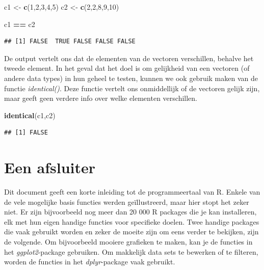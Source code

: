 \documentclass[
]{book}
\newenvironment{Shaded}{\begin{snugshade}}{\end{snugshade}}
\newcommand{\DecValTok}[1]{\textcolor[rgb]{0.00,0.00,0.81}{#1}}
\newcommand{\FunctionTok}[1]{\textcolor[rgb]{0.13,0.29,0.53}{\textbf{#1}}}
\newcommand{\NormalTok}[1]{#1}
\newcommand{\OtherTok}[1]{\textcolor[rgb]{0.56,0.35,0.01}{#1}}
\newcommand{\SpecialCharTok}[1]{\textcolor[rgb]{0.81,0.36,0.00}{\textbf{#1}}}
\begin{document}
\begin{Shaded}
\begin{Highlighting}[]
\NormalTok{c1 }\OtherTok{\textless{}{-}} \FunctionTok{c}\NormalTok{(}\DecValTok{1}\NormalTok{,}\DecValTok{2}\NormalTok{,}\DecValTok{3}\NormalTok{,}\DecValTok{4}\NormalTok{,}\DecValTok{5}\NormalTok{)}
\NormalTok{c2 }\OtherTok{\textless{}{-}} \FunctionTok{c}\NormalTok{(}\DecValTok{2}\NormalTok{,}\DecValTok{2}\NormalTok{,}\DecValTok{8}\NormalTok{,}\DecValTok{9}\NormalTok{,}\DecValTok{10}\NormalTok{)}

\NormalTok{c1 }\SpecialCharTok{==}\NormalTok{ c2}
\end{Highlighting}
\end{Shaded}

\begin{verbatim}
## [1] FALSE  TRUE FALSE FALSE FALSE
\end{verbatim}

De output vertelt ons dat de elementen van de vectoren verschillen, behalve het tweede element. In het geval dat het doel is om gelijkheid van een vectoren (of andere data types) in hun geheel te testen, kunnen we ook gebruik maken van de functie \emph{identical()}. Deze functie vertelt ons onmiddellijk of de vectoren gelijk zijn, maar geeft geen verdere info over welke elementen verschillen.

\begin{Shaded}
\begin{Highlighting}[]
\FunctionTok{identical}\NormalTok{(c1,c2)}
\end{Highlighting}
\end{Shaded}

\begin{verbatim}
## [1] FALSE
\end{verbatim}

\hypertarget{een-afsluiter}{%
\chapter{Een afsluiter}\label{een-afsluiter}}

Dit document geeft een korte inleiding tot de programmeertaal van R. Enkele van de vele mogelijke basis functies werden geïllustreerd, maar hier stopt het zeker niet. Er zijn bijvoorbeeld nog meer dan 20 000 R packages die je kan installeren, elk met hun eigen handige functies voor specifieke doelen. Twee handige packages die vaak gebruikt worden en zeker de moeite zijn om eens verder te bekijken, zijn de volgende. Om bijvoorbeeld mooiere grafieken te maken, kan je de functies in het \emph{ggplot2}-package gebruiken. Om makkelijk data sets te bewerken of te filteren, worden de functies in het \emph{dplyr}-package vaak gebruikt.
\end{document}
